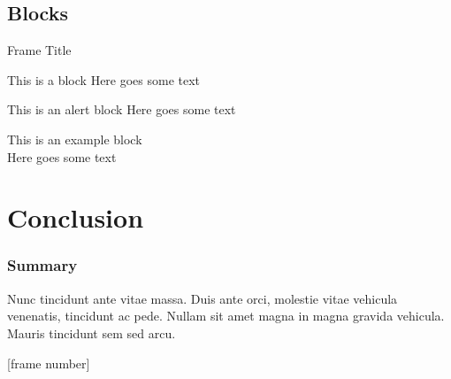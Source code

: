 \documentclass[
	11pt,
	aspectratio=169,
]{beamer}
\begin{document}
\subsection{Blocks}

\begin{frame}{Frame Title}
    \begin{block}{This is a block}
    Here goes some text
    \end{block}

    \begin{alertblock}{This is an alert block}
    Here goes some text
    \end{alertblock}

    \begin{examples}{This is an example block}
    \\Here goes some text
    \end{examples}
\end{frame}

\section{Conclusion}
\begin{frame}
	\frametitle{Summary}
	Nunc tincidunt ante vitae massa. Duis ante orci, molestie vitae vehicula venenatis, tincidunt ac pede. Nullam sit amet magna in magna gravida vehicula. Mauris tincidunt sem sed arcu.
\end{frame}


\begin{frame}
	\titlepage %
\end{frame}
[frame number]


\end{document}
